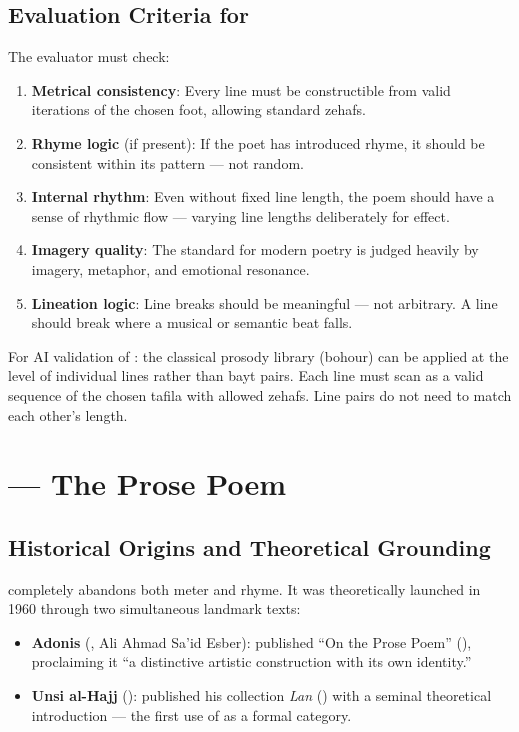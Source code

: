 \subsection{Evaluation Criteria for }

The evaluator must check:
\begin{enumerate}
  \item \textbf{Metrical consistency}: Every line must be constructible from valid iterations of the chosen foot, allowing standard zehafs.
  \item \textbf{Rhyme logic} (if present): If the poet has introduced rhyme, it should be consistent within its pattern — not random.
  \item \textbf{Internal rhythm}: Even without fixed line length, the poem should have a sense of rhythmic flow — varying line lengths deliberately for effect.
  \item \textbf{Imagery quality}: The standard for modern poetry is judged heavily by imagery, metaphor, and emotional resonance.
  \item \textbf{Lineation logic}: Line breaks should be meaningful — not arbitrary. A line should break where a musical or semantic beat falls.
\end{enumerate}

\begin{implnote}
For AI validation of : the classical prosody library (bohour) can be applied at the level of individual lines rather than bayt pairs. Each line must scan as a valid sequence of the chosen tafila with allowed zehafs. Line pairs do not need to match each other's length.
\end{implnote}

\section{ — The Prose Poem}
\label{sec:prose_poem}

\subsection{Historical Origins and Theoretical Grounding}

 completely abandons both meter and rhyme. It was theoretically launched in 1960 through two simultaneous landmark texts:

\begin{itemize}
  \item \textbf{Adonis} (, Ali Ahmad Sa'id Esber): published ``On the Prose Poem'' (), proclaiming it ``a distinctive artistic construction with its own identity.''
  \item \textbf{Unsi al-Hajj} (): published his collection \textit{Lan} () with a seminal theoretical introduction — the first use of  as a formal category.
\end{itemize}

